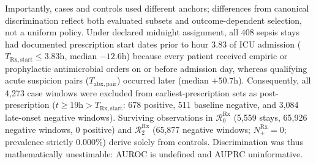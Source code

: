 \documentclass[10pt,twocolumn,a4paper]{article}
\begin{document}
Importantly, cases and controls used different anchors; differences from canonical discrimination reflect both evaluated subsets and outcome-dependent selection, not a uniform policy. Under declared midnight assignment, all 408 sepsis stays had documented prescription start dates prior to hour 3.83 of ICU admission ($T_{\mathrm{Rx,start}} \le 3.83\text{h}$, median $-12.6\text{h}$) because every patient received empiric or prophylactic antimicrobial orders on or before admission day, whereas qualifying acute suspicion pairs ($T_{\mathrm{abx,pair}}$) occurred later (median $+50.7\text{h}$). Consequently, all 4,273 case windows were excluded from earliest-prescription sets as post-prescription ($t \ge 19\text{h} > T_{\mathrm{Rx,start}}$: 678 positive, 511 baseline negative, and 3,084 late-onset negative windows). Surviving observations in $\mathcal{R}_0^{\mathrm{Rx}}$ (5,559 stays, 65,926 negative windows, 0 positive) and $\mathcal{R}_2^{\mathrm{Rx}}$ (65,877 negative windows; $N_+^{\mathrm{Rx}} = 0$; prevalence strictly 0.000\%) derive solely from controls. Discrimination was thus mathematically unestimable: AUROC is undefined and AUPRC uninformative.
\end{document}
